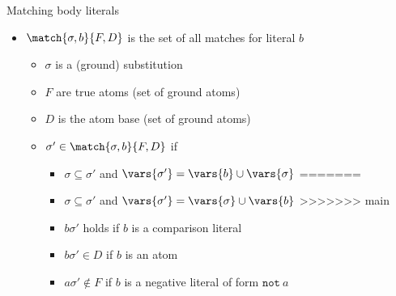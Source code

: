 \begin{frame}{Matching body literals}
  \bigskip
  \begin{itemize}
  \item<4-> \(\match{\sigma,b}{F,D}\) is the set of \alert{all matches for literal} \(b\)
    \begin{itemize}\normalsize
    \item \(\sigma\) is a (ground) substitution
    \item \(F\) are true atoms (set of ground atoms)
    \item \(D\) is the atom base (set of ground atoms)
      \medskip
    \item<5-8> \(\sigma' \in \match{\sigma,b}{F,D}\) if%
      \begin{itemize}\normalsize
<<<<<<< HEAD
      \item \(\sigma \subseteq \sigma'\) and \(\vars{\sigma'} = \vars{b} \cup \vars{\sigma}\)
=======
            \item \(\sigma \subseteq \sigma'\) and \(\vars{\sigma'} = \vars{\sigma} \cup \vars{b}\)
>>>>>>> main
        \smallskip
      \item \(b\sigma'\) holds if \(b\) is a comparison literal
      \item \(b\sigma' \in D\) if \(b\) is an atom
      \item \(a\sigma' \not\in F\) if \(b\) is a negative literal of form \(\texttt{not}\ a\)
      \end{itemize}
    \end{itemize}
  \end{itemize}
\end{frame}
